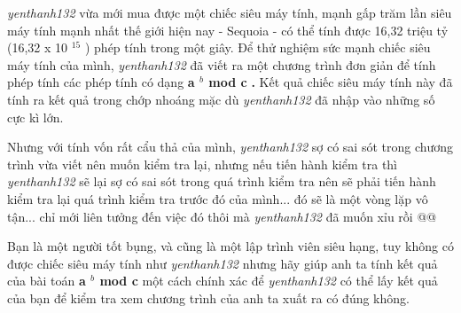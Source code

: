 \emph{      yenthanh132     }     vừa mới mua được một chiếc siêu máy tính, mạnh gấp trăm lần siêu máy tính mạnh nhất thế giới hiện nay - Sequoia - có thể tính được 16,32 triệu tỷ (16,32 x 10    $^      15     $     ) phép tính trong một giây. Để thử nghiệm sức mạnh chiếc siêu máy tính của mình,    \emph{      yenthanh132     }     đã viết ra một chương trình đơn giản để tính phép tính các phép tính có dạng    \textbf{      a     $^       b      $      mod c     }\textbf{      .     }\textbf{}     Kết quả chiếc siêu máy tính này đã tính ra kết quả trong chớp nhoáng mặc dù    \emph{      yenthanh132     }     đã nhập vào những số cực kì lớn.    



     Nhưng với tính vốn rất cẩu thả của mình,    \emph{      yenthanh132     }     sợ có sai sót trong chương trình vừa viết nên muốn kiểm tra lại, nhưng nếu tiến hành kiểm tra thì    \emph{      yenthanh132     }     sẽ lại sợ có sai sót trong quá trình kiểm tra nên sẽ phải tiến hành kiểm tra lại quá trình kiểm tra trước đó của mình... đó sẽ là một vòng lặp vô tận... chỉ mới liên tưởng đến việc đó thôi mà    \emph{      yenthanh132     }     đã muốn xỉu rồi @@    



     Bạn là một người tốt bụng, và cũng là một lập trình viên siêu hạng, tuy không có được chiếc siêu máy tính như    \emph{      yenthanh132     }     nhưng hãy giúp anh ta tính kết quả của bài toán    \textbf{      a     $^       b      $      mod c     }     một cách chính xác để    \emph{      yenthanh132     }     có thể lấy kết quả của bạn để kiểm tra xem chương trình của anh ta xuất ra có đúng không.    

\